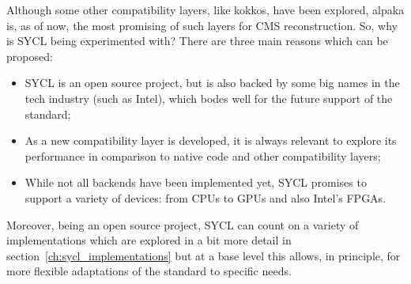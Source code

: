 Although some other compatibility layers, like kokkos, have been explored, alpaka is, as of now, the most promising of such layers for CMS reconstruction. So, why is SYCL being experimented with? There are three main reasons which can be proposed:
\begin{itemize}
    \item SYCL is an open source project, but is also backed by some big names in the tech industry (such as Intel), which bodes well for the future support of the standard;
    \item As a new compatibility layer is developed, it is always relevant to explore its performance in comparison to native code and other compatibility layers;
    \item While not all backends have been implemented yet, SYCL promises to support a variety of devices: from CPUs to GPUs and also Intel's FPGAs.
\end{itemize}
Moreover, being an open source project, SYCL can count on a variety of implementations which are explored in a bit more detail in section~\ref{ch:sycl_implementations} but at a base level this allows, in principle, for more flexible adaptations of the standard to specific needs. 